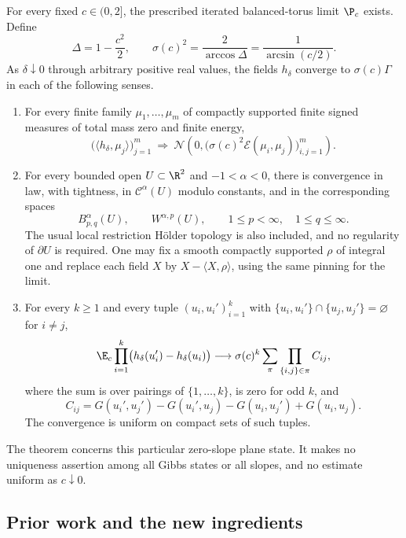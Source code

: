 \begin{theorem}\label{thm:main}
For every fixed \(c\in(0,2]\), the prescribed iterated balanced-torus limit
\(\P_c\) exists. Define
\begin{equation}\label{eq:multiplier}
 \Delta=1-\frac{c^2}{2},\qquad
 \sigma(c)^2=\frac2{\arccos\Delta}=\frac1{\arcsin(c/2)}.
\end{equation}
As \(\delta\downarrow0\) through arbitrary positive real values,
the fields \(h_\delta\) converge to
\(\sigma(c)\Gamma\) in each of the following senses.
\begin{enumerate}
\item For every finite family \(\mu_1,\ldots,\mu_m\) of compactly supported
finite signed measures of total mass zero and finite energy,
\[
 \bigl(\langle h_\delta,\mu_j\rangle\bigr)_{j=1}^m
 \ \Longrightarrow\
 \mathcal N\!\left(0,
       \bigl(\sigma(c)^2\mathcal E(\mu_i,\mu_j)\bigr)_{i,j=1}^m\right).
\]
\item For every bounded open \(U\subset\R^2\) and \(-1<\alpha<0\), there
is convergence in law, with tightness, in \(\mathcal C^\alpha(U)\) modulo
constants, and in the corresponding spaces
\[
 B^\alpha_{p,q}(U),\qquad W^{\alpha,p}(U),
 \qquad 1\le p<\infty,\quad 1\le q\le\infty.
\]
The usual local restriction Hölder topology is also included, and no
regularity of \(\partial U\) is required. One may fix a
smooth compactly supported \(\rho\) of integral one and replace each field
\(X\) by \(X-\langle X,\rho\rangle\), using the same pinning for the limit.
\item For every \(k\ge1\) and every tuple
\((u_i,u_i')_{i=1}^k\) with
\(\{u_i,u_i'\}\cap\{u_j,u_j'\}=\varnothing\) for \(i\ne j\),
\begin{equation}\label{eq:increment-main}
 \E_c\prod_{i=1}^k
    \bigl(h_\delta(u_i')-h_\delta(u_i)\bigr)
 \longrightarrow
 \sigma(c)^k\sum_{\pi}\prod_{\{i,j\}\in\pi}C_{ij},
\end{equation}
where the sum is over pairings of \(\{1,\ldots,k\}\), is zero for odd \(k\),
and
\[
 C_{ij}=G(u_i',u_j')-G(u_i',u_j)-G(u_i,u_j')+G(u_i,u_j).
\]
The convergence is uniform on compact sets of such tuples.
\end{enumerate}
\end{theorem}

The theorem concerns this particular zero-slope plane state. It makes no
uniqueness assertion among all Gibbs states or all slopes, and no estimate
uniform as \(c\downarrow0\).

\subsection{Prior work and the new ingredients}

